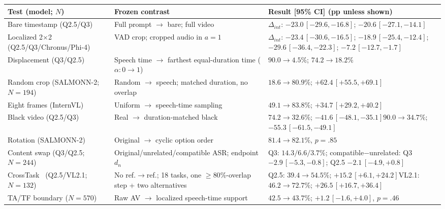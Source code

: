 \setlength{\tabcolsep}{2.0pt}
\renewcommand{\arraystretch}{0.86}
\begin{tabular}{@{}>{\raggedright\arraybackslash}p{}>{\raggedright\arraybackslash}p{}>{\raggedright\arraybackslash}p{}@{}}
\toprule
Test (model; $N$) & Frozen contrast & Result [95\% CI] (pp unless shown) \\
\midrule
Bare timestamp (Q2.5/Q3) & Full prompt $\to$ bare; full video & $\Delta_{int}$: $-23.0\,[-29.6,-16.8]$; $-20.6\,[-27.1,-14.1]$ \\
Localized 2$\times$2 (Q2.5/Q3/Chronus/Phi-4) & VAD crop; cropped audio in $a=1$ & $\Delta_{int}$: $-23.4\,[-30.6,-16.5]$; $-18.9\,[-25.4,-12.4]$; $-29.6\,[-36.4,-22.3]$; $-7.2\,[-12.7,-1.7]$ \\
\midrule
Displacement (Q3/Q2.5) & Speech time $\to$ farthest equal-duration time ($\alpha:0\to1$) & $90.0\to4.5\%$; $74.2\to18.2\%$ \\
Random crop (SALMONN-2; $N=194$) & Random $\to$ speech; matched duration, no overlap & $18.6\to80.9\%$; $+62.4\,[+55.5,+69.1]$ \\
Eight frames (InternVL) & Uniform $\to$ speech-time sampling & $49.1\to83.8\%$; $+34.7\,[+29.2,+40.2]$ \\
Black video (Q2.5/Q3) & Real $\to$ duration-matched black & $74.2\to32.6\%$; $-41.6\,[-48.1,-35.1]$\newline $90.0\to34.7\%$; $-55.3\,[-61.5,-49.1]$ \\
Rotation (SALMONN-2) & Original $\to$ cyclic option order & $81.4\to82.1\%$, $p=.85$ \\
\midrule
Content swap (Q3/Q2.5; $N=244$) & Original/unrelated/compatible ASR; endpoint $d_n$ & Q3: $14.3/6.6/3.7\%$; compatible$-$unrelated: Q3 $-2.9\,[-5.3,-0.8]$; Q2.5 $-2.1\,[-4.9,+0.8]$ \\
CrossTask~\cite{zhukov2019crosstask} (Q2.5/VL2.1; $N=132$) & No ref.$\to$ref.; 18 tasks, one $\geq80\%$-overlap step + two alternatives & Q2.5: $39.4\to54.5\%$; $+15.2\,[+6.1,+24.2]$\newline VL2.1: $46.2\to72.7\%$; $+26.5\,[+16.7,+36.4]$ \\
TA/TF boundary ($N=570$) & Raw AV $\to$ localized speech-time support & $42.5\to43.7\%$; $+1.2\,[-1.6,+4.0]$, $p=.46$ \\
\bottomrule
\end{tabular}
